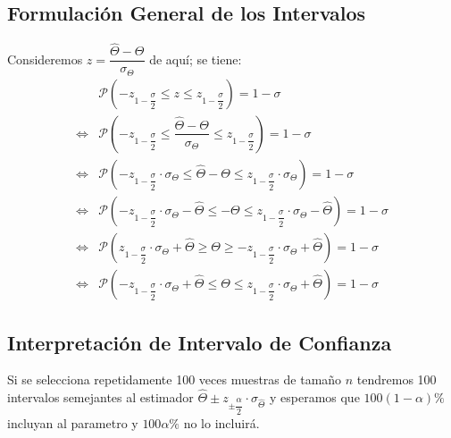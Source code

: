\subsection{Formulación General de los Intervalos}
Consideremos $z = \dfrac{\widehat{\Theta}-\Theta}{\sigma_\Theta}$ de aquí; se tiene:
\begin{align*}
&\mathcal{P}\left( -z_{1-\dfrac{\sigma}{2}} \leq z \leq  z_{1-\dfrac{\sigma}{2}} \right) = 1-\sigma \\
\Leftrightarrow & \mathcal{P}\left(-z_{1-\dfrac{\sigma}{2}} \leq \dfrac{\widehat{\Theta}-\Theta}{\sigma_\Theta} \leq  z_{1-\dfrac{\sigma}{2}}   \right) = 1-\sigma \\
\Leftrightarrow & \mathcal{P}\left(-z_{1-\dfrac{\sigma}{2}}\cdot\sigma_\Theta \leq \widehat{\Theta}-\Theta \leq  z_{1-\dfrac{\sigma}{2}} \cdot \sigma_\Theta  \right) = 1-\sigma \\ 
\Leftrightarrow & \mathcal{P}\left(-z_{1-\dfrac{\sigma}{2}}\cdot\sigma_\Theta - \widehat{\Theta} \leq -\Theta \leq  z_{1-\dfrac{\sigma}{2}} \cdot \sigma_\Theta -\widehat{\Theta} \right) = 1-\sigma \\
\Leftrightarrow & \mathcal{P}\left( z_{1-\dfrac{\sigma}{2}}\cdot\sigma_\Theta + \widehat{\Theta} \geq \Theta \geq  -z_{1-\dfrac{\sigma}{2}} \cdot \sigma_\Theta +\widehat{\Theta} \right) = 1-\sigma \\
\Leftrightarrow & \mathcal{P}\left( -z_{1-\dfrac{\sigma}{2}}\cdot\sigma_\Theta + \widehat{\Theta} \leq \Theta \leq    z_{1-\dfrac{\sigma}{2}} \cdot \sigma_\Theta +\widehat{\Theta} \right) = 1-\sigma 
\end{align*}
\subsection{Interpretación de Intervalo de Confianza}
Si se selecciona repetidamente 100 veces muestras de tamaño $n$ tendremos 100 intervalos semejantes al estimador $\widehat{\Theta}\pm z_{\pm \dfrac{\alpha}{2}}\cdot \sigma_{\widehat{\Theta}}$ y esperamos que $100(1-\alpha)\%$ incluyan al parametro y $100\alpha\%$ no lo incluirá.

